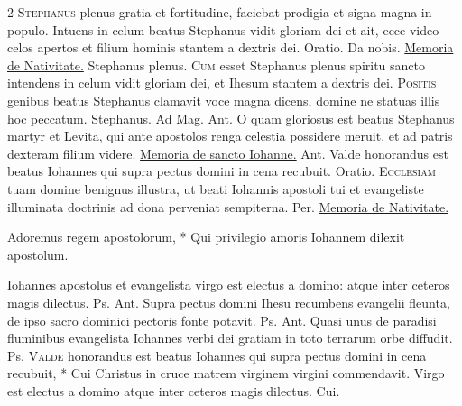 \begin{multicols*}{2}
\lettrine[lines=2]{\zallmancaps \color{Red} S}{tephanus} plenus gratia et fortitudine, faciebat prodigia et signa magna in populo.
 Intuens in celum beatus Stephanus vidit gloriam dei et ait, ecce video celos apertos et filium hominis stantem a dextris dei. {\color{Red} Oratio.} Da nobis. \ul{Memoria de Nativitate.}
 Stephanus plenus.
\lettrine[lines=2]{\zallmancaps \color{Blue} C}{um} esset Stephanus plenus spiritu sancto intendens in celum vidit gloriam dei, et Ihesum stantem a dextris dei.
\lettrine[lines=2]{\zallmancaps \color{Red} P}{ositis} genibus beatus Stephanus clamavit voce magna dicens, domine ne statuas illis hoc peccatum.
 Stephanus. {\color{Red} Ad Mag. Ant.} O quam gloriosus est beatus Stephanus martyr et Levita, qui ante apostolos renga celestia possidere meruit, et ad patris dexteram filium videre.
\newline \ul{Memoria de sancto Iohanne.} {\color{Red} Ant.} Valde honorandus est beatus Iohannes qui supra pectus domini in cena recubuit. {\color{Red} Oratio.}
\lettrine[lines=2]{\zallmancaps \color{Blue} E}{cclesiam} tuam domine benignus illustra, ut beati Iohannis apostoli tui et evangeliste illuminata doctrinis ad dona perveniat sempiterna. Per. \ul{Memoria de Nativitate.}
{\color{Red} }
\begin{invitatory}
{Adoremus regem apostolorum, * Qui privilegio amoris Iohannem dilexit apostolum.}
\end{invitatory}
 Iohannes apostolus et evangelista virgo est electus a domino: atque inter ceteros magis dilectus. {\color{Red} Ps.}  {\color{Red} Ant.} Supra pectus domini Ihesu recumbens evangelii fleunta, de ipso sacro dominici pectoris fonte potavit. {\color{Red} Ps.}  {\color{Red} Ant.} Quasi unus de paradisi fluminibus evangelista Iohannes verbi dei gratiam in toto terrarum orbe diffudit. {\color{Red} Ps.}  \R
\lettrine[lines=2]{\zallmancaps \color{Red} V}{alde} \hypertarget{valde-honorandus-est}{\label{valde-honorandus-est}} honorandus est beatus Iohannes qui supra pectus domini in cena recubuit, * Cui Christus in cruce matrem virginem virgini commendavit. \V Virgo est electus a domino atque inter ceteros magis dilectus. Cui.

\end{multicols*}
